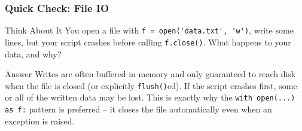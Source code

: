 \begin{frame}[fragile]\frametitle{Quick Check: File IO}
\begin{block}{Think About It}
You open a file with \lstinline|f = open('data.txt', 'w')|, write some lines, but your script
crashes before calling \lstinline|f.close()|. What happens to your data, and why?
\end{block}
\pause
\begin{block}{Answer}
Writes are often buffered in memory and only guaranteed to reach disk when the file is closed (or
explicitly \lstinline|flush()|ed). If the script crashes first, some or all of the written data
may be lost. This is exactly why the \lstinline|with open(...) as f:| pattern is preferred -- it
closes the file automatically even when an exception is raised.
\end{block}
\end{frame}